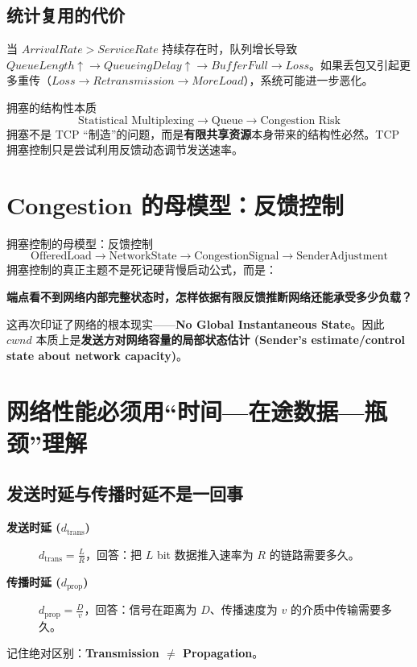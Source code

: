 \documentclass[11pt,a4paper,openany]{ctexbook}
\newcommand{\key}[1]{\textbf{\color{deep}#1}}
\begin{document}
\subsection{统计复用的代价}
当 $ArrivalRate > ServiceRate$ 持续存在时，队列增长导致 $QueueLength \uparrow \rightarrow QueueingDelay \uparrow \rightarrow BufferFull \rightarrow Loss$。如果丢包又引起更多重传（$Loss \rightarrow Retransmission \rightarrow MoreLoad$），系统可能进一步恶化。

\begin{corebox}{拥塞的结构性本质}
\[
\text{Statistical Multiplexing} \rightarrow \text{Queue} \rightarrow \text{Congestion Risk}
\]
拥塞不是 TCP “制造”的问题，而是\key{有限共享资源}本身带来的结构性必然。TCP 拥塞控制只是尝试利用反馈动态调节发送速率。
\end{corebox}

\section{Congestion 的母模型：反馈控制}
\begin{methodbox}{拥塞控制的母模型：反馈控制}
\[
\text{OfferedLoad} \rightarrow \text{NetworkState} \rightarrow \text{CongestionSignal} \rightarrow \text{SenderAdjustment}
\]
\tcblower
拥塞控制的真正主题不是死记硬背慢启动公式，而是：
\begin{center}
\key{端点看不到网络内部完整状态时，怎样依据有限反馈推断网络还能承受多少负载？}
\end{center}
这再次印证了网络的根本现实——\textbf{No Global Instantaneous State}。因此 $cwnd$ 本质上是\key{发送方对网络容量的局部状态估计 (Sender's estimate/control state about network capacity)}。
\end{methodbox}

\section{网络性能必须用“时间—在途数据—瓶颈”理解}
\subsection{发送时延与传播时延不是一回事}
\begin{description}
    \item[\key{发送时延 ($d_{\text{trans}}$)}] $d_{\text{trans}} = \frac{L}{R}$，回答：把 $L$ bit 数据推入速率为 $R$ 的链路需要多久。
    \item[\key{传播时延 ($d_{\text{prop}}$)}] $d_{\text{prop}} = \frac{D}{v}$，回答：信号在距离为 $D$、传播速度为 $v$ 的介质中传输需要多久。
\end{description}
记住绝对区别：\key{Transmission $\neq$ Propagation}。
\end{document}

